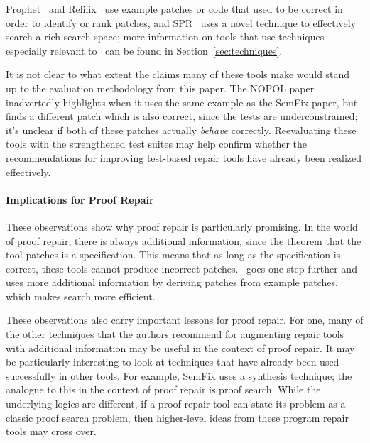Prophet~\cite{Long:2016:APG:2837614.2837617} and Relifix~\cite{Tan:2015:RAR:2818754.2818813} use example patches or code that used to be 
correct in order to identify or rank patches, and SPR~\cite{Long:2015:SPR:2786805.2786811} uses a novel technique to effectively search a rich search space;
more information on tools that use techniques especially relevant to \sysname\ can be found in Section~\ref{sec:techniques}.

It is not clear to what extent the claims many of these tools make would stand up to the evaluation methodology from this paper.
The NOPOL paper inadvertedly highlights  when it uses the same example as the SemFix paper,
but finds a different patch which is also correct, since the tests are underconstrained; it's unclear
if both of these patches actually \textit{behave} correctly. %
Reevaluating these tools with the strengthened test suites may help
confirm whether the recommendations for improving test-based repair tools have already been realized
effectively. %

\paragraph{Implications for Proof Repair}
These observations show why proof repair is particularly promising. In the world of proof repair, there is always additional information,
since the theorem that the tool patches is a specification.
This means that as long as the specification is correct, these tools cannot produce
incorrect patches. \sysname\ goes one step further and uses more additional information
by deriving patches from example patches, which makes search more efficient.

These observations also carry important lessons for proof repair.
For one, many of the other techniques that the authors recommend for augmenting repair tools with
additional information may be useful in the context of proof repair.
It may be particularly interesting to look at techniques that have already been used
successfully in other tools. For example, SemFix uses a synthesis technique;
the analogue to this in the context of proof repair is proof search. 
While the underlying logics are different, if a proof repair tool
can state its problem as a classic proof search problem, then higher-level ideas
from these program repair tools may cross over.


